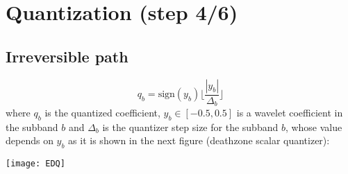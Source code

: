 \section{Quantization (step 4/6)}
\subsection*{Irreversible path}  
\begin{equation}
  q_b = \text{sign}(y_b)\Big\lfloor\frac{\displaystyle
    |y_b|}{\displaystyle \Delta_b}\Big\rfloor
\tag{J2KQuant}
\end{equation}
where $q_b$ is the quantized coefficient, $y_b\in [-0.5,0.5]$ is a
wavelet coefficient in the subband $b$ and $\Delta_b$ is the quantizer
step size for the subband $b$, whose value depends on $y_b$ as it is
shown in the next figure (deathzone scalar quantizer):

\begin{center}
  \texttt{[image: EDQ]}
\end{center}

\begin{comment}
  \item \textbf{Irreversible:} tiene como entrada los coeficientes
    wavelet que est'an en el rango $[-0.5,0.5]$ y como salida una
    palabra binaria (o 'indice de cuantificaci'on) de $x$ bits que
    depende del nivel de compresi'on seleccionado. Esta consiste en
    \begin{equation}
      q_b = \text{sign}(y_b)\Big\lfloor\frac{\displaystyle
        |y_b|}{\displaystyle \Delta_b}\Big\rfloor
    \end{equation}
    donde $y_b$ es un coeficiente wavelet de la banda de frecuencia
    $b$ y $\Delta_b$ es el tama~no del paso del cuantificador escalar
    progresivo con ``deadzone'', es decir, el par'ametro que define el
    nivel de compresi'on. $\Delta_b$ es distinto para cada banda porque
    el peso relativo de cada una de ellas es diferente (v'ease la
    Secci'on \ref{sec:pesos_bandas}).

    \newpage
    Un ejemplo para dos primeros niveles de cuantificaci'on diferentes:
    \begin{center}
      \texttt{[image: EDQ]}
    \end{center}

    Los coeficientes cuantificados ('indices de cuantificaci'on) $q_b$
    son los que se codifican entr'opicamente.
\end{comment}


